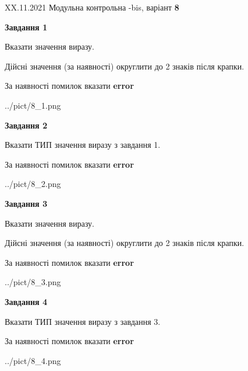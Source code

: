 \documentclass[11pt, ukrainian]{article}
\begin{document}
{XX.11.2021 Модульна контрольна -bis, варіант  \No \textbf { 8 }\par}
{
\begin {large}
{\begin {center}\textbf{Завдання 1}\end {center}}\par
Вказати значення виразу. \par
Дійсні значення (за наявності) округлити до 2 знаків після крапки. \par
За наявності помилок вказати \textbf{error}

\begin{center}
	{../pict/8_1.png}
\end{center}
\newpage

{\begin {center}\textbf{Завдання 2}\end {center}}\par
Вказати ТИП значення виразу з завдання 1. \par
За наявності помилок вказати \textbf{error}

\begin{center}
	{../pict/8_2.png}
\end{center}
\newpage

{\begin {center}\textbf{Завдання 3}\end {center}}\par
Вказати значення виразу. \par
Дійсні значення (за наявності) округлити до 2 знаків після крапки. \par
За наявності помилок вказати \textbf{error}

\begin{center}
	{../pict/8_3.png}
\end{center}
\newpage

{\begin {center}\textbf{Завдання 4}\end {center}}\par
Вказати ТИП значення виразу з завдання 3. \par
За наявності помилок вказати \textbf{error}

\begin{center}
	{../pict/8_4.png}
\end{center}
\newpage


\end{large}}
\end{document}
